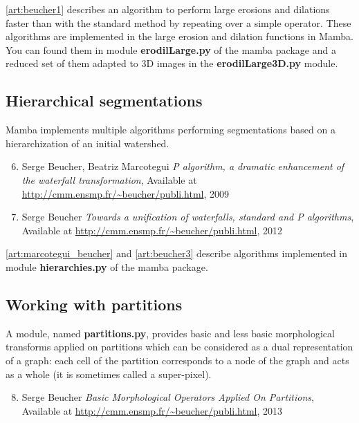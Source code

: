 \documentclass[a4paper,10pt,oneside]{article}
\begin{document}
\ref{art:beucher1} describes an algorithm to perform large erosions and
dilations faster than with the standard method by repeating over a simple
operator. These algorithms are implemented in the large erosion and dilation
functions in Mamba. You can found them in module \textbf{erodilLarge.py} of
the mamba package and a reduced set of them adapted to 3D images in the
\textbf{erodilLarge3D.py} module.

\subsection{Hierarchical segmentations}
\label{cha:hierar_seg}

Mamba implements multiple algorithms performing segmentations based on
a hierarchization of an initial watershed.

\begin{enumerate}
\setcounter{enumi}{5}
\item \label{art:marcotegui_beucher} Serge Beucher, Beatriz Marcotegui
\emph{P algorithm, a dramatic enhancement of the waterfall transformation},
Available at \url{http://cmm.ensmp.fr/~beucher/publi.html}, 2009

\item \label{art:beucher3} Serge Beucher
\emph{Towards a unification of waterfalls, standard and P algorithms},
Available at \url{http://cmm.ensmp.fr/~beucher/publi.html}, 2012
\end{enumerate}

\ref{art:marcotegui_beucher} and \ref{art:beucher3} describe algorithms
implemented in module \textbf{hierarchies.py} of the mamba package.

\subsection{Working with partitions}
\label{cha:partitions}

A module, named \textbf{partitions.py}, provides basic and less basic
morphological transforms applied on partitions which can be considered as a dual representation
of a graph: each cell of the partition corresponds to a node of the graph and acts as a whole
(it is sometimes called a super-pixel).

\begin{enumerate}
\setcounter{enumi}{7}
\item \label{art:beucher4} Serge Beucher
\emph{Basic Morphological Operators Applied On Partitions},
Available at \url{http://cmm.ensmp.fr/~beucher/publi.html}, 2013
\end{enumerate}
\end{document}
